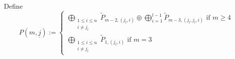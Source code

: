 \documentclass{amsart}
\newtheorem{lemma}[theorem]{Lemma}
\numberwithin{equation}{section}
\newcommand{\uj}{{\underline j}}
\newcommand{\Ext}{\operatorname{Ext}}
\begin{document}
\begin{comment}
\begin{lemma}
  \begin{enumerate}
    \item $\tilde P_m^{(i_1,\ldots,i_{n-1})}\cong\tilde P_{m-1}^{(i_n)}$
    \item The subrepresentation $\bigoplus_{i=1}^{k-1}\tilde P_{m-1,i}\oplus\bigoplus_{i=1}^k\tilde P_{m-2,i}\subset\bigoplus_{i=1}^k\tilde P_{m-1,i}$ is in $(\tilde P_m^{(k)})^\perp$ and
      \[\Ext(\bigoplus_{i=1}^k\tilde P_{m-1,i},\tilde P_m^{(k)})\cong\Ext(\tilde P_{m-1}^{(k)},\tilde P_m^{(k)}),\]
      where $\tilde P_{m-1}^{(k)}$ above denotes the cokernel of the inclusion.\footnote{do we need this? See also proof of Lemma 4.5}
  \end{enumerate}
\end{lemma}
\begin{proof}
The first statement follows for instance by induction when applying BGP-reflections.
\end{proof}
----TO HERE----DO NOT NEED THIS----
\end{comment}
Define 
$$P(m,\uj):=\begin{cases}\bigoplus_{\substack{1\leq i\leq n\\i\neq j_l}}\tilde P_{m-2,(j_l,i)}\oplus \bigoplus_{i=1}^{l-1}\tilde P_{m-3,(j_l,j_l,i)}\text{ if }m\geq 4\\\bigoplus_{\substack{1\leq i\leq n\\i\neq j_l}}\tilde P_{1,(j_l,i)}\text{ if }m=3\end{cases}$$
\end{document}
